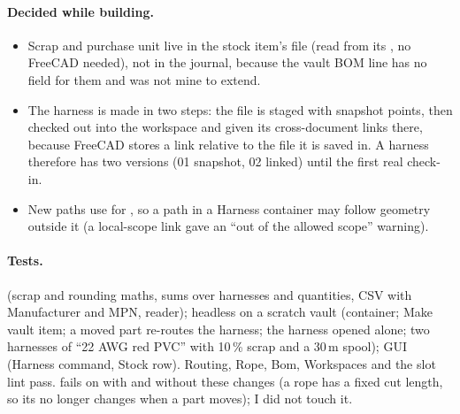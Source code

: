 \paragraph{Decided while building.}
\begin{itemize}[nosep]
  \item Scrap and purchase unit live in the stock item's file (read from its , no FreeCAD needed),
        not in the journal, because the vault BOM line has no field for them and  was not mine to extend.
  \item The harness is made in two steps: the file is staged with snapshot points, then checked out into the
        workspace and given its cross-document links there, because FreeCAD stores a link relative to the file it is
        saved in. A harness therefore has two versions (01 snapshot, 02 linked) until the first real check-in.
  \item New paths use  for , so a path in a Harness container
        may follow geometry outside it (a local-scope link gave an ``out of the allowed scope'' warning).
\end{itemize}

\paragraph{Tests.}  (scrap and rounding maths, sums over harnesses and
quantities, CSV with Manufacturer and MPN,  reader); headless  on a
scratch vault (container; Make vault item; a moved part re-routes the harness; the harness opened alone; two harnesses
of ``22 AWG red PVC'' with 10\,\% scrap and a 30\,m spool); GUI  (Harness command, Stock
row). Routing, Rope, Bom, Workspaces and the slot lint pass.  fails on
 with and without these changes (a rope has a fixed cut length, so its
 no longer changes when a part moves); I did not touch it.

